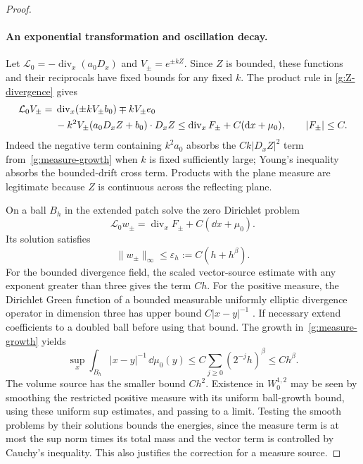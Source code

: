 \begin{proof}
\paragraph{An exponential transformation and oscillation decay.}
Let $\mathcal L_0=-\operatorname{div}_x(a_0D_x)$ and
$V_\pm=e^{\pm kZ}$.  Since $Z$ is bounded, these functions and their
reciprocals have fixed bounds for any fixed $k$.  The product rule in
\eqref{g:Z-divergence} gives
\begin{align}
 \mathcal L_0 V_\pm
  ={}&\operatorname{div}_x(\pm kV_\pm b_0)
       \mp kV_\pm e_0\notag\\
    &-k^2V_\pm(a_0D_xZ+b_0)\cdot D_xZ
 \leq\operatorname{div}_x F_\pm+C(\mathrm d x+\mu_0),
 \qquad |F_\pm|\leq C.\label{g:exponential}
\end{align}
Indeed the negative term containing $k^2a_0$ absorbs the
$Ck|D_xZ|^2$ term from~\eqref{g:measure-growth} when $k$ is fixed
sufficiently large; Young's inequality absorbs the bounded-drift cross
term.  Products with the plane measure are legitimate because $Z$ is
continuous across the reflecting plane.

On a ball $B_h$ in the extended patch solve the zero Dirichlet problem
\[
 \mathcal L_0w_\pm
       =\operatorname{div}_x F_\pm+C(\dd x+\mu_0).
\]
Its solution satisfies
\begin{equation}\label{g:green-correction}
 \|w_\pm\|_\infty\leq\varepsilon_h:=C(h+h^\beta).
\end{equation}
For the bounded divergence field, the scaled vector-source estimate
with any exponent greater than three gives the term $Ch$.  For the
positive measure, the Dirichlet Green function of a bounded measurable
uniformly elliptic divergence operator in dimension three has upper
bound $C|x-y|^{-1}$ \cite{LittmanStampacchiaWeinberger1963}.  If necessary
extend coefficients to a doubled ball before using that bound.  The
growth in~\eqref{g:measure-growth} yields
\[
 \sup_x\int_{B_h}|x-y|^{-1}\,\dd\mu_0(y)
 \leq C\sum_{j\geq0}(2^{-j}h)^\beta\leq Ch^\beta.
\]
The volume source has the smaller bound $Ch^2$.  Existence in
$W^{1,2}_0$ may be seen by smoothing the restricted positive measure
with its uniform ball-growth bound, using these uniform sup estimates,
and passing to a limit.  Testing the smooth problems by their solutions
bounds the energies, since the measure term is at most the sup norm
times its total mass and the vector term is controlled by Cauchy's
inequality.  This also justifies the correction for a measure source.


\end{proof}
